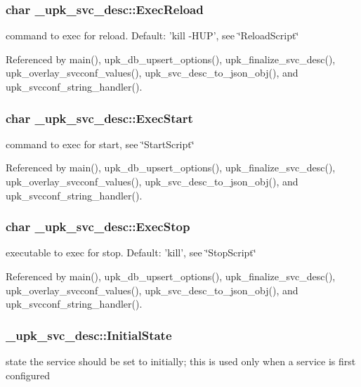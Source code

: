 \subsubsection[{ExecReload}]{\setlength{\rightskip}{0pt plus 5cm}char {\bf \_\-upk\_\-svc\_\-desc::ExecReload}}\label{struct__upk__svc__desc_ad078cbde8e1f25af15c90270f9a82cfd}
command to exec for reload. Default: 'kill -\/HUP', see \char`\"{}ReloadScript\char`\"{} 

Referenced by main(), upk\_\-db\_\-upsert\_\-options(), upk\_\-finalize\_\-svc\_\-desc(), upk\_\-overlay\_\-svcconf\_\-values(), upk\_\-svc\_\-desc\_\-to\_\-json\_\-obj(), and upk\_\-svcconf\_\-string\_\-handler().

\subsubsection[{ExecStart}]{\setlength{\rightskip}{0pt plus 5cm}char {\bf \_\-upk\_\-svc\_\-desc::ExecStart}}\label{struct__upk__svc__desc_ae013728670cf1af65a371dd8d84529ca}
command to exec for start, see \char`\"{}StartScript\char`\"{} 

Referenced by main(), upk\_\-db\_\-upsert\_\-options(), upk\_\-finalize\_\-svc\_\-desc(), upk\_\-overlay\_\-svcconf\_\-values(), upk\_\-svc\_\-desc\_\-to\_\-json\_\-obj(), and upk\_\-svcconf\_\-string\_\-handler().

\subsubsection[{ExecStop}]{\setlength{\rightskip}{0pt plus 5cm}char {\bf \_\-upk\_\-svc\_\-desc::ExecStop}}\label{struct__upk__svc__desc_ad302f492adb3d64ad3314810035ed6f0}
executable to exec for stop. Default: 'kill', see \char`\"{}StopScript\char`\"{} 

Referenced by main(), upk\_\-db\_\-upsert\_\-options(), upk\_\-finalize\_\-svc\_\-desc(), upk\_\-overlay\_\-svcconf\_\-values(), upk\_\-svc\_\-desc\_\-to\_\-json\_\-obj(), and upk\_\-svcconf\_\-string\_\-handler().

\subsubsection[{InitialState}]{ {\bf \_\-upk\_\-svc\_\-desc::InitialState}}\label{struct__upk__svc__desc_a49b38ed1095da250a2eb392d0cbc663d}
state the service should be set to initially; this is used only when a service is first configured 

